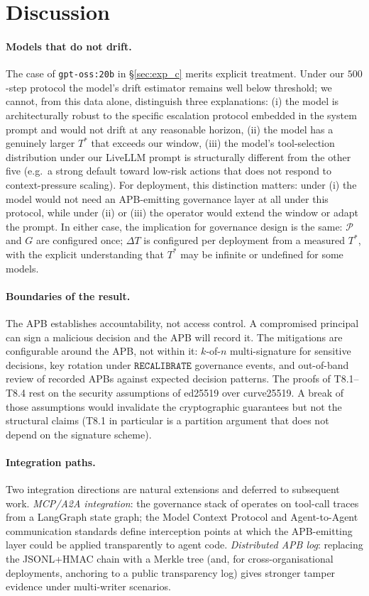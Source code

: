 \documentclass[11pt]{article}
\newcommand{\RECAL}{\texttt{RECALIBRATE}}
\newcommand{\Pset}{\mathcal{P}}
\newcommand{\Tstar}{T^*}
\begin{document}
\section{Discussion}
\label{sec:discussion}

\paragraph{Models that do not drift.}
The case of \texttt{gpt-oss:20b} in \S\ref{sec:exp_c} merits explicit
treatment. Under our $500$-step protocol the model's drift estimator
remains well below threshold; we cannot, from this data alone,
distinguish three explanations:
(i) the model is architecturally robust to the specific escalation
protocol embedded in the system prompt and would not drift at any
reasonable horizon,
(ii) the model has a genuinely larger $\Tstar$ that exceeds our
window,
(iii) the model's tool-selection distribution under our LiveLLM
prompt is structurally different from the other five (e.g.\ a
strong default toward low-risk actions that does not respond to
context-pressure scaling).
For deployment, this distinction matters: under (i) the model would
not need an APB-emitting governance layer at all under this
protocol, while under (ii) or (iii) the operator would extend the
window or adapt the prompt. In either case, the implication for
governance design is the same: $\Pset$ and $G$ are configured
once; $\Delta T$ is configured per deployment from a measured
$\Tstar$, with the explicit understanding that $\Tstar$ may be
infinite or undefined for some models.

\paragraph{Boundaries of the result.}
The APB establishes accountability, not access control. A
compromised principal can sign a malicious decision and the APB
will record it. The mitigations are configurable around the APB,
not within it: $k$-of-$n$ multi-signature for sensitive decisions,
key rotation under $\RECAL$ governance events, and out-of-band
review of recorded APBs against expected decision patterns.
The proofs of T8.1--T8.4 rest on the security assumptions of
ed25519 over curve25519. A break of those assumptions would
invalidate the cryptographic guarantees but not the structural
claims (T8.1 in particular is a partition argument that does not
depend on the signature scheme).

\paragraph{Integration paths.}
Two integration directions are natural extensions and deferred to
subsequent work. \emph{MCP/A2A integration}: the governance stack of
\citep{fernandez2026applied} operates on tool-call traces from a
LangGraph state graph; the Model Context Protocol and Agent-to-Agent
communication standards define interception points at which the
APB-emitting layer could be applied transparently to agent code.
\emph{Distributed APB log}: replacing the JSONL+HMAC chain with a
Merkle tree (and, for cross-organisational deployments, anchoring
to a public transparency log) gives stronger tamper evidence under
multi-writer scenarios.
\end{document}
